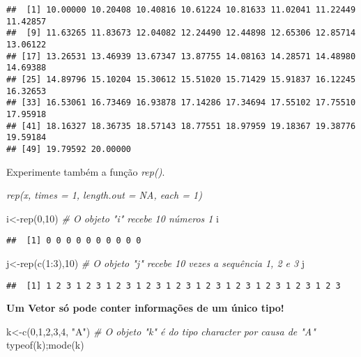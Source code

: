 \documentclass[
]{book}
\newenvironment{Shaded}{\begin{snugshade}}{\end{snugshade}}
\newcommand{\CommentTok}[1]{\textcolor[rgb]{0.56,0.35,0.01}{\textit{#1}}}
\newcommand{\DecValTok}[1]{\textcolor[rgb]{0.00,0.00,0.81}{#1}}
\newcommand{\FunctionTok}[1]{\textcolor[rgb]{0.00,0.00,0.00}{#1}}
\newcommand{\NormalTok}[1]{#1}
\newcommand{\OtherTok}[1]{\textcolor[rgb]{0.56,0.35,0.01}{#1}}
\newcommand{\SpecialCharTok}[1]{\textcolor[rgb]{0.00,0.00,0.00}{#1}}
\newcommand{\StringTok}[1]{\textcolor[rgb]{0.31,0.60,0.02}{#1}}
\begin{document}
\begin{verbatim}
##  [1] 10.00000 10.20408 10.40816 10.61224 10.81633 11.02041 11.22449 11.42857
##  [9] 11.63265 11.83673 12.04082 12.24490 12.44898 12.65306 12.85714 13.06122
## [17] 13.26531 13.46939 13.67347 13.87755 14.08163 14.28571 14.48980 14.69388
## [25] 14.89796 15.10204 15.30612 15.51020 15.71429 15.91837 16.12245 16.32653
## [33] 16.53061 16.73469 16.93878 17.14286 17.34694 17.55102 17.75510 17.95918
## [41] 18.16327 18.36735 18.57143 18.77551 18.97959 19.18367 19.38776 19.59184
## [49] 19.79592 20.00000
\end{verbatim}

Experimente também a função \emph{rep()}.

\emph{\emph{rep(x, times = 1, length.out = NA, each = 1)}}

\begin{Shaded}
\begin{Highlighting}[]
\NormalTok{i}\OtherTok{\textless{}{-}}\FunctionTok{rep}\NormalTok{(}\DecValTok{0}\NormalTok{,}\DecValTok{10}\NormalTok{) }\CommentTok{\# O objeto "i" recebe 10 números 1}
\NormalTok{i}
\end{Highlighting}
\end{Shaded}

\begin{verbatim}
##  [1] 0 0 0 0 0 0 0 0 0 0
\end{verbatim}

\begin{Shaded}
\begin{Highlighting}[]
\NormalTok{j}\OtherTok{\textless{}{-}}\FunctionTok{rep}\NormalTok{(}\FunctionTok{c}\NormalTok{(}\DecValTok{1}\SpecialCharTok{:}\DecValTok{3}\NormalTok{),}\DecValTok{10}\NormalTok{) }\CommentTok{\# O objeto "j" recebe 10 vezes a sequência 1, 2 e 3}
\NormalTok{j}
\end{Highlighting}
\end{Shaded}

\begin{verbatim}
##  [1] 1 2 3 1 2 3 1 2 3 1 2 3 1 2 3 1 2 3 1 2 3 1 2 3 1 2 3 1 2 3
\end{verbatim}

\textbf{Um Vetor só pode conter informações de um único tipo!}

\begin{Shaded}
\begin{Highlighting}[]
\NormalTok{k}\OtherTok{\textless{}{-}}\FunctionTok{c}\NormalTok{(}\DecValTok{0}\NormalTok{,}\DecValTok{1}\NormalTok{,}\DecValTok{2}\NormalTok{,}\DecValTok{3}\NormalTok{,}\DecValTok{4}\NormalTok{, }\StringTok{"A"}\NormalTok{) }\CommentTok{\# O objeto "k" é do tipo character por causa de "A"}
\FunctionTok{typeof}\NormalTok{(k);}\FunctionTok{mode}\NormalTok{(k)}
\end{Highlighting}
\end{Shaded}
\end{document}
